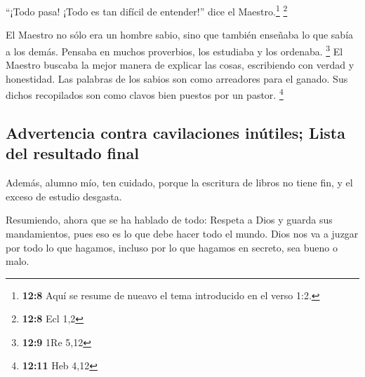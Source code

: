  ``¡Todo pasa! ¡Todo es tan difícil de entender!'' dice el
Maestro.\footnote{\textbf{12:8} Aquí se resume de nueavo el tema
  introducido en el verso 1:2.} \footnote{\textbf{12:8} Ecl 1,2}

 El Maestro no sólo era un hombre sabio, sino que también
enseñaba lo que sabía a los demás. Pensaba en muchos proverbios, los
estudiaba y los ordenaba. \footnote{\textbf{12:9} 1Re 5,12}
 El Maestro buscaba la mejor manera de explicar las
cosas, escribiendo con verdad y honestidad.  Las palabras
de los sabios son como arreadores para el ganado. Sus dichos recopilados
son como clavos bien puestos por un pastor. \footnote{\textbf{12:11} Heb
  4,12}

\hypertarget{advertencia-contra-cavilaciones-inuxfatiles-lista-del-resultado-final}{%
\subsection{Advertencia contra cavilaciones inútiles; Lista del
resultado
final}\label{advertencia-contra-cavilaciones-inuxfatiles-lista-del-resultado-final}}

 Además, alumno mío, ten cuidado, porque la escritura de
libros no tiene fin, y el exceso de estudio desgasta.

 Resumiendo, ahora que se ha hablado de todo: Respeta a
Dios y guarda sus mandamientos, pues eso es lo que debe hacer todo el
mundo.  Dios nos va a juzgar por todo lo que hagamos,
incluso por lo que hagamos en secreto, sea bueno o malo.
